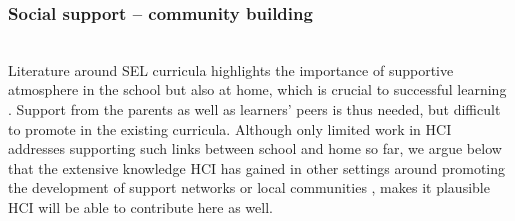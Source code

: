 \documentclass[prodmode,acmtochi]{acmsmall}
\newcommand{\rephrase}[1]{\textrm{\textrm{\textcolor{gray}{#1}}}}
\begin{document}
%
%







\subsubsection{Social support -- community building} 
\label{sec:Embedding-social}
~ \\
Literature around SEL curricula highlights the importance of supportive atmosphere in the school but also at home, which is crucial to successful learning \cite{Maree2007,Patrikakou2005,Pasi2001}.  Support from the parents as well as learners' peers is thus needed, but difficult to promote in the existing curricula. Although only limited work in HCI addresses supporting such links between school and home so far, we argue below that the extensive knowledge HCI has gained in other settings around promoting the development of support networks \cite{Skeels2010,Massimi2013,Barak2008} or local communities \cite{Ganglbauer2014,Lewis2012,Lopez2013,Massung2013}, makes it plausible HCI will be able to contribute here as well.
\end{document}
